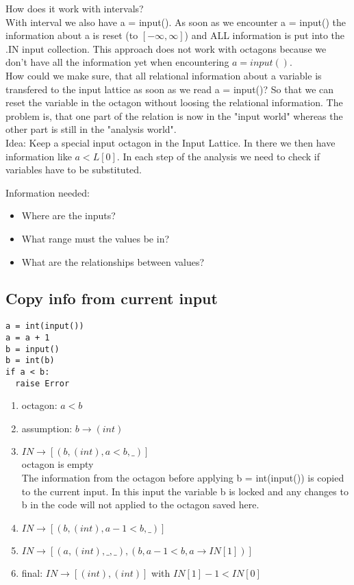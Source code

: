 \documentclass[11pt]{article}
\begin{document}
How does it work with intervals?\\
With interval we also have a = input(). As soon as we encounter a = input() the information about a is reset (to $[-\infty, \infty]$) and ALL information is put into the .IN input collection. This approach does not work with octagons because we don't have all the information yet when encountering $a = input()$.\\
How could we make sure, that all relational information about a variable is transfered to the input lattice as soon as we read a = input()? So that we can reset the variable in the octagon without loosing the relational information. The problem is, that one part of the relation is now in the "input world" whereas the other part is still in the "analysis world".\\
Idea: Keep a special input octagon in the Input Lattice. In there we then have information like $a < L[0]$. In each step of the analysis we need to check if variables have to be substituted. 

Information needed:
\begin{itemize}
  \item Where are the inputs?
  \item What range must the values be in?
  \item What are the relationships between values?
\end{itemize}

\subsection{Copy info from current input}

\begin{lstlisting}
a = int(input())
a = a + 1
b = input()
b = int(b)
if a < b:
  raise Error
\end{lstlisting}

\begin{enumerate}
  \item octagon: $a < b$
  \item assumption: $b \rightarrow (int)$
  \item $IN \rightarrow [(b, (int), a < b, \_)]$\\
  octagon is empty\\
  The information from the octagon before applying b = int(input()) is copied to the current input. In this input the variable b is locked and any changes to b in the code will not applied to the octagon saved here.
  \item $IN \rightarrow [(b, (int), a - 1 < b, \_)]$
  \item $IN \rightarrow [(a, (int), \_, \_), (b,  a - 1 <b, a \rightarrow IN[1])]$
  \item final: $IN \rightarrow [(int), (int)]$ with $IN[1] - 1 < IN[0]$
\end{enumerate}
\end{document}
